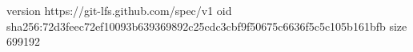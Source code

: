 version https://git-lfs.github.com/spec/v1
oid sha256:72d3feec72ef10093b639369892c25cdc3cbf9f50675c6636f5c5c105b161bfb
size 699192
